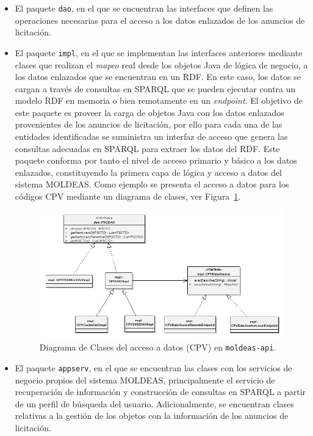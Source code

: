 \begin{itemize}
 \item El paquete \texttt{dao}, en el que se encuentran las interfaces 
que definen las operaciones necesarias para el acceso a los datos enlazados 
de los anuncios de licitación.

\item El paquete \texttt{impl}, en el que se implementan las interfaces 
anteriores mediante clases que realizan el \textit{mapeo} real 
desde los objetos Java de lógica de negocio, a los datos enlazados 
que se encuentran en un \dataset RDF. En este caso, los datos se cargan a través 
de consultas en SPARQL que se pueden ejecutar contra un modelo RDF en memoria 
o bien remotamente en un \textit{endpoint}. El objetivo de este paquete es proveer 
la carga de objetos Java con los datos enlazados provenientes de los anuncios de licitación, 
por ello para cada una de las entidades identificadas se suministra un interfaz de acceso 
que genera las consultas adecuadas en SPARQL para extraer los datos del \dataset RDF. Este 
paquete conforma por tanto el nivel de acceso primario y básico a los datos enlazados, 
constituyendo la primera capa de lógica y acceso a datos del sistema MOLDEAS. Como ejemplo 
se presenta el acceso a datos para los códigos CPV mediante un diagrama de clases, 
ver Figura~\ref{fig:moldeas-api-dao}.

\begin{figure}[!htb]
\centering
	\includegraphics[width=16cm]{images/phd/moldeas/moldeas-dao}
\caption{Diagrama de Clases del acceso a datos (CPV) en \texttt{moldeas-api}.}
\label{fig:moldeas-api-dao}
\end{figure}


\item El paquete \texttt{appserv}, en el que se encuentran las clases con los servicios 
de negocio propios del sistema MOLDEAS, principalmente el servicio de recuperación 
de información y construcción de consultas en SPARQL a partir de un perfil de búsqueda 
del usuario. Adicionalmente, se encuentran clases relativas a la gestión de los objetos 
con la información de los anuncios de licitación.


\end{itemize}
